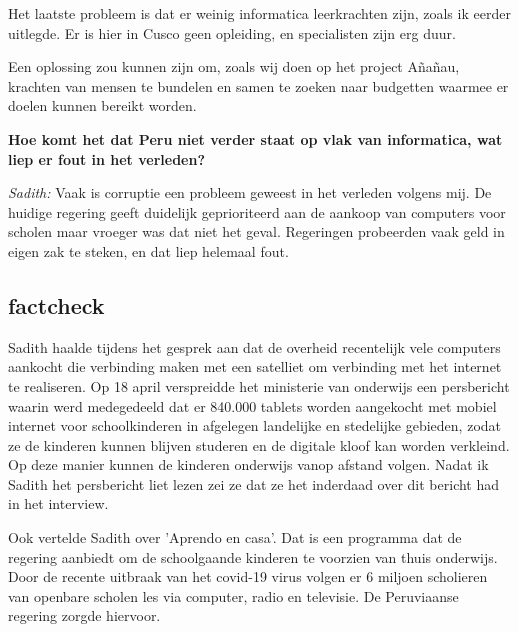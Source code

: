 Het laatste probleem is dat er weinig informatica leerkrachten zijn, zoals ik eerder uitlegde. Er is hier in Cusco geen opleiding, en specialisten zijn erg duur.

Een oplossing zou kunnen zijn om, zoals wij doen op het project Añañau, krachten van mensen te bundelen en samen te zoeken naar budgetten waarmee er doelen kunnen bereikt worden. 

\textbf{Hoe komt het dat Peru niet verder staat op vlak van informatica, wat liep er fout in het verleden?}

\textit{Sadith:} Vaak is corruptie een probleem geweest in het verleden volgens mij. De huidige regering geeft duidelijk geprioriteerd aan de aankoop van computers voor scholen maar vroeger was dat niet het geval. Regeringen probeerden vaak geld in eigen zak te steken, en dat liep helemaal fout. 
 
\subsection{factcheck}
Sadith haalde tijdens het gesprek aan dat de overheid recentelijk vele computers aankocht die verbinding maken met een satelliet om verbinding met het internet te realiseren. Op 18 april verspreidde het ministerie van onderwijs een persbericht waarin werd medegedeeld dat er 840.000 tablets worden aangekocht met mobiel internet voor schoolkinderen in afgelegen landelijke en stedelijke gebieden, zodat ze de kinderen kunnen blijven studeren en de digitale kloof kan worden verkleind. Op deze manier kunnen de kinderen onderwijs vanop afstand volgen.\autocite{Minedu2020} Nadat ik Sadith het persbericht liet lezen zei ze dat ze het inderdaad over dit bericht had in het interview. 

Ook vertelde Sadith over 'Aprendo en casa'. Dat is een programma dat de regering aanbiedt om de schoolgaande kinderen te voorzien van thuis onderwijs. Door de recente uitbraak van het covid-19 virus volgen er 6 miljoen scholieren van openbare scholen les via computer, radio en televisie. De Peruviaanse regering zorgde hiervoor. \autocite{Minedu2020a}

